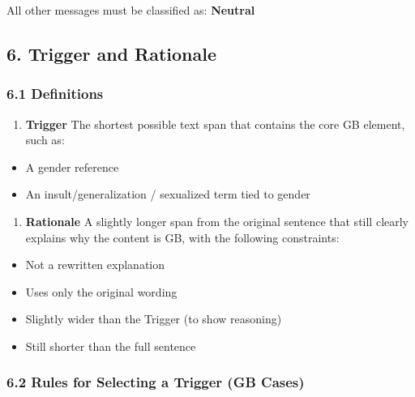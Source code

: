 \documentclass[12pt,oneside,openright,a4paper]{cpe-english-project}
\begin{document}
All other messages must be classified as: \textbf{Neutral}

\subsection{6. Trigger and Rationale}\label{trigger-and-rationale}

\subsubsection{6.1 Definitions}\label{definitions-1}

\begin{enumerate}
\setlength{\itemsep}{0.15\baselineskip}
\setlength{\parsep}{0pt}
\setlength{\parskip}{0pt}
\def\labelenumi{\arabic{enumi})}
\item
  \textbf{Trigger}
  The shortest possible text span that contains the core GB element,
  such as:
\end{enumerate}

\begin{itemize}
\setlength{\itemsep}{0.15\baselineskip}
\setlength{\parsep}{0pt}
\setlength{\parskip}{0pt}
\item
  A gender reference
\item
  An insult/generalization / sexualized term tied to gender
\end{itemize}

\begin{enumerate}
\setlength{\itemsep}{0.15\baselineskip}
\setlength{\parsep}{0pt}
\setlength{\parskip}{0pt}
\def\labelenumi{\arabic{enumi})}
\setcounter{enumi}{1}
\item
  \textbf{Rationale}
  A slightly longer span from the original sentence that still clearly
  explains why the content is GB, with the following constraints:
\end{enumerate}

\begin{itemize}
\setlength{\itemsep}{0.15\baselineskip}
\setlength{\parsep}{0pt}
\setlength{\parskip}{0pt}
\item
  Not a rewritten explanation
\item
  Uses only the original wording
\item
  Slightly wider than the Trigger (to show reasoning)
\item
  Still shorter than the full sentence
\end{itemize}

\subsubsection{6.2 Rules for Selecting a Trigger (GB Cases)}\label{rules-for-selecting-a-trigger-gb-cases}
\end{document}
